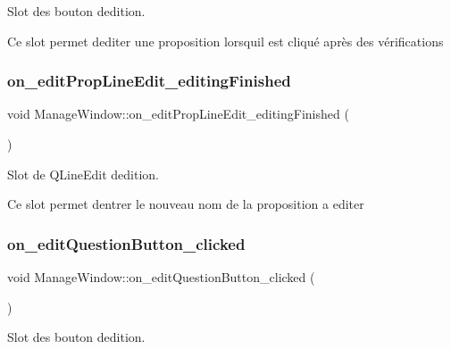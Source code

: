 Slot des bouton d\textquotesingle{}edition. 

Ce slot permet d\textquotesingle{}editer une proposition lorsqu\textquotesingle{}il est cliqué après des vérifications \mbox{\label{classManageWindow_aa6223c4f4deb479dd97dc386e6425a6a}} 
\subsubsection{\texorpdfstring{on\+\_\+edit\+Prop\+Line\+Edit\+\_\+editing\+Finished}{on\_editPropLineEdit\_editingFinished}}
{\footnotesize\ttfamily void Manage\+Window\+::on\+\_\+edit\+Prop\+Line\+Edit\+\_\+editing\+Finished (\begin{DoxyParamCaption}{ }\end{DoxyParamCaption})\hspace{0.3cm}{\ttfamily [slot]}}



Slot de Q\+Line\+Edit d\textquotesingle{}edition. 

Ce slot permet d\textquotesingle{}entrer le nouveau nom de la proposition a editer \mbox{\label{classManageWindow_a302b93485498f6bfbe5c362298222620}} 
\subsubsection{\texorpdfstring{on\+\_\+edit\+Question\+Button\+\_\+clicked}{on\_editQuestionButton\_clicked}}
{\footnotesize\ttfamily void Manage\+Window\+::on\+\_\+edit\+Question\+Button\+\_\+clicked (\begin{DoxyParamCaption}{ }\end{DoxyParamCaption})\hspace{0.3cm}{\ttfamily [slot]}}



Slot des bouton d\textquotesingle{}edition. 

